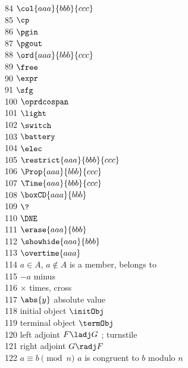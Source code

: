 \documentclass[11pt, book]{memoir}
\begin{document}
\begin{multicols}{3}
 84 $\col{aaa}{bbb}{ccc}$ \\
 85 $\cp$ \\
 86 $\pgin$ \\
 87 $\pgout$ \\
 88 $\ord{aaa}{bbb}{ccc}$ \\
 89 $\free$ \\
 90 $\expr$ \\
 91 $\sfg$ \\
100 $\oprdcospan$ \\
101 $\light$ \\
102 $\switch$ \\
103 $\battery$ \\
104 $\elec$ \\
105 $\restrict{aaa}{bbb}{ccc}$ \\
106 $\Prop{aaa}{bbb}{ccc}$ \\
107 $\Time{aaa}{bbb}{ccc}$ \\
108 $\boxCD{aaa}{bbb}$ \\
109 $\?$ \\
110 $\DNE$ \\
111 $\erase{aaa}{bbb}$ \\
112 $\showhide{aaa}{bbb}$ \\
113 $\overtime{aaa}$ \\
114 $a \in A$, $a \notin A$ is a member, belongs to \\
115 $\minus a$ minus \\
116 $\times $ times, cross \\
117 $\abs{y}$ absolute value \\
118 initial object $\initObj$ \\
119 terminal object $\termObj$ \\
120 left adjoint $F \ladj G$ ; turnstile \\
121 right adjoint $G \radj F$ \\
122 $a \equiv b \pmod {n}$ $a$ is congruent to $b$ modulo $n$

\end{multicols}
\end{document}

